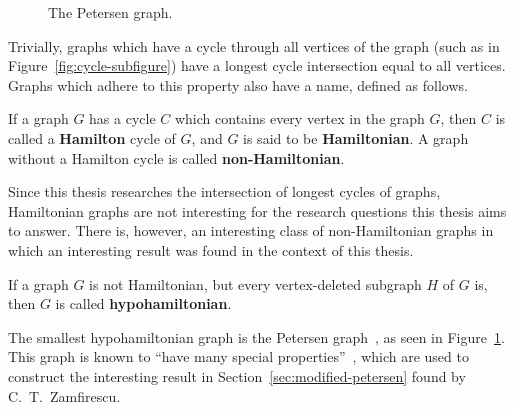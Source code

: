 \begin{figure}[ht]
    \centering
    \caption{The Petersen graph.}
    \label{fig:petersen-graph}
\end{figure}

Trivially, graphs which have a cycle through all vertices of the graph (such as in Figure~\ref{fig:cycle-subfigure}) have a longest cycle intersection equal to all vertices. Graphs which adhere to this property also have a name, defined as follows.

\begin{definition}
  If a graph $G$ has a cycle $C$ which contains every vertex in the graph $G$, then $C$ is called a \textbf{Hamilton} cycle of $G$, and $G$ is said to be \textbf{Hamiltonian}. A graph without a Hamilton cycle is called \textbf{non-Hamiltonian}.
\end{definition}

Since this thesis researches the intersection of longest cycles of graphs, Hamiltonian graphs are not interesting for the research questions this thesis aims to answer. There is, however, an interesting class of non-Hamiltonian graphs in which an interesting result was found in the context of this thesis.

\begin{definition}
  If a graph $G$ is not Hamiltonian, but every vertex-deleted subgraph $H$ of $G$ is, then $G$ is called \textbf{hypohamiltonian}.
\end{definition}

The smallest hypohamiltonian graph is the Petersen graph~\cite{article:van-aardt}, as seen in Figure~\ref{fig:petersen-graph}. This graph is known to ``have many special properties''~\cite{book:bondy-definitions}, which are used to construct the interesting result in Section~\ref{sec:modified-petersen} found by C.\ T.\ Zamfirescu.

